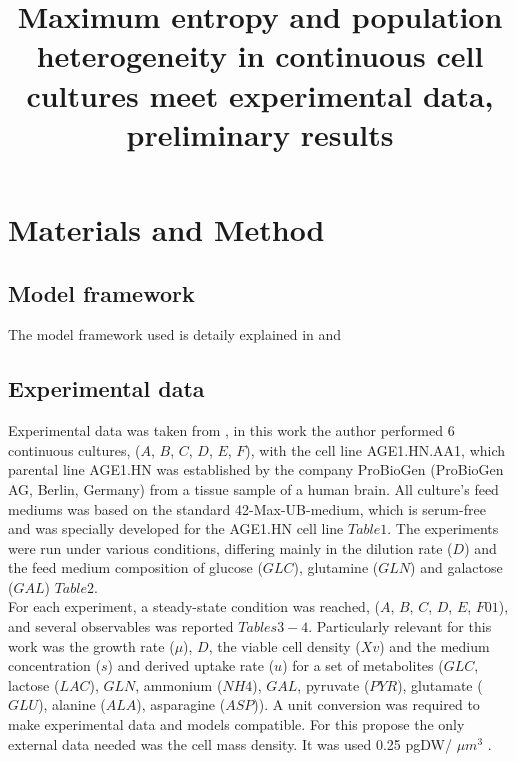 \documentclass[]{article}
\title{Maximum entropy and population heterogeneity in continuous cell cultures meet experimental data, preliminary results}
\author{}
\begin{document}
	
	\maketitle
		
	\section{Materials and Method}
	
	\subsection{Model framework }
	
	The model framework used is detaily explained in \cite{Fernandez-de-Cossio-Diaz2017} and \cite{Fernandez-de-Cossio-Diaz2018b}
	
	\subsection{Experimental data} %
	
	Experimental data was taken from \cite{Rath2017a}, in this work the author performed 6 continuous cultures, ($A$, $B$, $C$, $D$, $E$, $F$), with the cell line AGE1.HN.AA1, which parental line AGE1.HN was established by the company ProBioGen (ProBioGen AG, Berlin, Germany) from a tissue sample of a human brain. All culture's feed mediums was based on the standard 42-Max-UB-medium, which is serum-free and was specially developed for the AGE1.HN cell line $Table 1$. The experiments were run under various conditions, differing mainly in the dilution rate ($D$) and the feed medium composition of glucose ($GLC$), glutamine ($GLN$) and galactose ($GAL$) $Table 2$. \\
	For each experiment, a steady-state condition was reached, ($A$, $B$, $C$, $D$, $E$, $F01$), and several observables  was reported $Tables 3-4$. Particularly relevant for this work was the growth rate ($\mu$), $D$, the viable cell density ($Xv$) and the medium concentration ($s$) and derived uptake rate ($u$) for a set of metabolites ($GLC$, lactose ($LAC$), $GLN$, ammonium ($NH4$), $GAL$, pyruvate ($PYR$), glutamate ($GLU$), alanine ($ALA$), asparagine ($ASP$)). A unit conversion was required to make experimental data and models compatible. For this propose the only external data needed was the cell mass density. It was used  0.25 pgDW/ $\mu$$m^3$ \cite{Niklas2010}.
	
\end{document}
